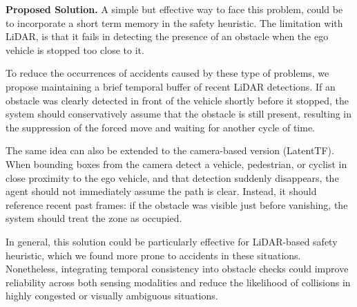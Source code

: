 \noindent\textbf{Proposed Solution.} A simple but effective way to face this problem, could be to incorporate a short term memory in the safety heuristic. The limitation with LiDAR, is that it fails in detecting the presence of an obstacle when the ego vehicle is stopped too close to it. 

To reduce the occurrences of accidents caused by these type of problems, we propose maintaining a brief temporal buffer of recent LiDAR detections. If an obstacle was clearly detected in front of the vehicle shortly before it stopped, the system should conservatively assume that the obstacle is still present, resulting in the suppression of the forced move and waiting for another cycle of time.

The same idea can also be extended to the camera-based version (LatentTF). When bounding boxes from the camera detect a vehicle, pedestrian, or cyclist in close proximity to the ego vehicle, and that detection suddenly disappears, the agent should not immediately assume the path is clear. Instead, it should reference recent past frames: if the obstacle was visible just before vanishing, the system should treat the zone as occupied.

In general, this solution could be particularly effective for LiDAR-based safety heuristic, which we found more prone to accidents in these situations. 
Nonetheless, integrating temporal consistency into obstacle checks could improve reliability across both sensing modalities and reduce the likelihood of collisions in highly congested or visually ambiguous situations.
